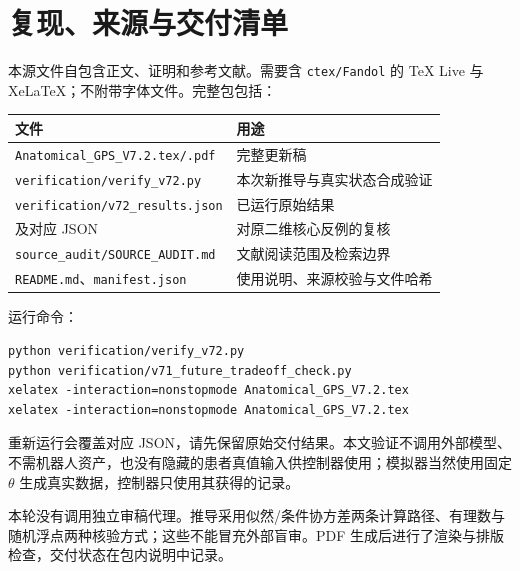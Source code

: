\documentclass[UTF8,fontset=fandol,11pt,a4paper]{ctexart}
\theoremstyle{definition}\newtheorem{definition}[theorem]{定义}\newtheorem{assumption}[theorem]{条件}
\numberwithin{equation}{section}
\begin{document}
\section{复现、来源与交付清单}
\label{app:reproduce}
本源文件自包含正文、证明和参考文献。需要含 \texttt{ctex/Fandol} 的 TeX Live 与 XeLaTeX；不附带字体文件。完整包包括：
\begin{center}\small
\begin{tabularx}{\linewidth}{p{.45\linewidth}Y}
\toprule
文件 & 用途\\\midrule
\texttt{Anatomical\_GPS\_V7.2.tex/.pdf} & 完整更新稿\\
\texttt{verification/verify\_v72.py} & 本次新推导与真实状态合成验证\\
\texttt{verification/v72\_results.json} & 已运行原始结果\\
 及对应 JSON & 对原二维核心反例的复核\\
\texttt{source\_audit/SOURCE\_AUDIT.md} & 文献阅读范围及检索边界\\
\texttt{README.md}、\texttt{manifest.json} & 使用说明、来源校验与文件哈希\\
\bottomrule
\end{tabularx}
\end{center}
运行命令：
\begin{verbatim}
python verification/verify_v72.py
python verification/v71_future_tradeoff_check.py
xelatex -interaction=nonstopmode Anatomical_GPS_V7.2.tex
xelatex -interaction=nonstopmode Anatomical_GPS_V7.2.tex
\end{verbatim}
重新运行会覆盖对应 JSON，请先保留原始交付结果。本文验证不调用外部模型、不需机器人资产，也没有隐藏的患者真值输入供控制器使用；模拟器当然使用固定 $\theta$ 生成真实数据，控制器只使用其获得的记录。

本轮没有调用独立审稿代理。推导采用似然/条件协方差两条计算路径、有理数与随机浮点两种核验方式；这些不能冒充外部盲审。PDF 生成后进行了渲染与排版检查，交付状态在包内说明中记录。
\end{document}
